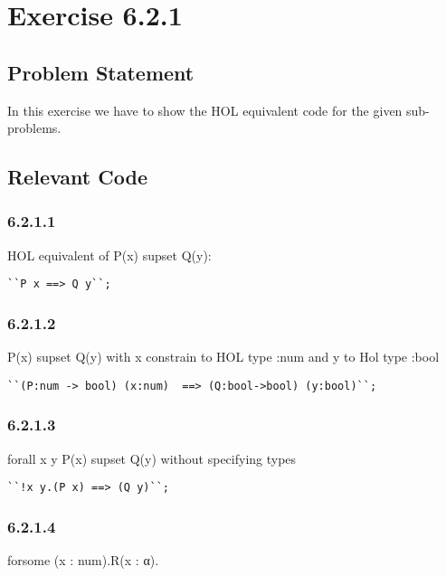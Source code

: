 \documentclass{report}
\begin{document}
\chapter{Exercise 6.2.1}
\label{cha:exercise-6.2.1}

\section{Problem Statement}
\label{sec:problem-statement-5}

In this exercise we have to show the HOL equivalent code for the given sub-problems.

\section{Relevant Code}
\label{sec:relevant-code-5}

\subsection{6.2.1.1}
\label{sec:6.2.1.1}

 HOL equivalent of P(x) supset Q(y):

\lstset{frameround=tttt}
\begin{lstlisting}[frame=tRBL]
``P x ==> Q y``;
\end{lstlisting}

\subsection{6.2.1.2}
\label{sec:6.2.1.2}
P(x) supset Q(y) with x constrain to HOL type :num and y to Hol type :bool 

\lstset{frameround=tttt}
\begin{lstlisting}[frame=tRBL]
``(P:num -> bool) (x:num)  ==> (Q:bool->bool) (y:bool)``;
\end{lstlisting}

\subsection{6.2.1.3}
\label{sec:6.2.1.3}
forall x y P(x) supset Q(y) without specifying types

\lstset{frameround=tttt}
\begin{lstlisting}[frame=tRBL]
``!x y.(P x) ==> (Q y)``;
\end{lstlisting}

\subsection{6.2.1.4}
\label{sec:6.2.1.4}
forsome (x : num).R(x : α).
\end{document}
